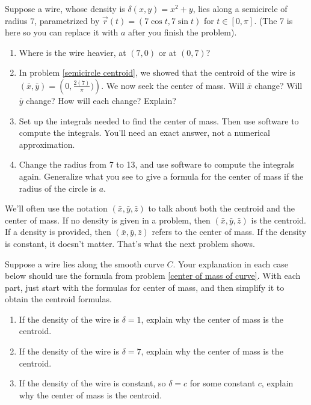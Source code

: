 \begin{problem}
%
Suppose a wire, whose density is $\delta(x,y)=x^2+y$, lies along a semicircle of radius $7$, parametrized by $\vec r(t) = (7\cos t, 7\sin t)$ for $t\in[0,\pi]$. (The 7 is here so you can replace it with $a$ after you finish the problem).
\begin{enumerate}
 \item Where is the wire heavier, at $(7,0)$ or at $(0,7)$?
 \item In problem \ref{semicircle centroid}, we showed that the centroid of the wire is $(\bar x, \bar y) = \left(0,\frac{2(7)}{\pi})\right)$.  We now seek the center of mass. Will $\bar x$ change?  Will $\bar y$ change?  How will each change? Explain?
 \item Set up the integrals needed to find the center of mass. Then use software to compute the integrals. You'll need an exact answer, not a numerical approximation.
 \item Change the radius from 7 to 13, and use software to compute the integrals again.  Generalize what you see to give a formula for the center of mass if the radius of the circle is $a$.
\end{enumerate}
\end{problem}

We'll often use the notation $(\bar x, \bar y,\bar z)$ to talk about both the centroid and the center of mass. If no density is given in a problem, then $(\bar x, \bar y,\bar z)$ is the centroid. If a density is provided, then $(\bar x, \bar y,\bar z)$ refers to the center of mass. If the density is constant, it doesn't matter. That's what the next problem shows.

\begin{problem}
 Suppose a wire lies along the smooth curve $C$. Your explanation in each case below should use the formula from problem \ref{center of mass of curve}. With each part, just start with the formulas for center of mass, and then simplify it to obtain the centroid formulas.
\begin{enumerate}
 \item If the density of the wire is $\delta =1$, explain why the center of mass is the centroid. 
 \item If the density of the wire is $\delta =7$, explain why the center of mass is the centroid.
 \item If the density of the wire is constant, so $\delta =c$ for some constant $c$, explain why the center of mass is the centroid.
\end{enumerate}
\end{problem}

